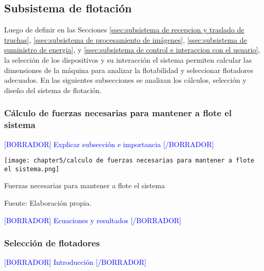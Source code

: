 \subsection{Subsistema de flotación}
\label{ssec:subsistema de flotacion}

Luego de definir en las Secciones \ref{ssec:subsistema de recepcion y traslado de truchas}, \ref{ssec:subsistema de procesamiento de imágenes}, \ref{ssec:subsistema de suministro de energia}, y \ref{ssec:subsistema de control e interaccion con el usuario}, la selección de los dispositivos y su interacción el sistema permiten calcular las dimensiones de la máquina para analizar la flotabilidad y seleccionar flotadores adecuados. En las siguientes subsecciones se analizan los cálculos, selección y diseño del sistema de flotación.

\subsubsection{Cálculo de fuerzas necesarias para mantener a flote el sistema}

\textcolor{blue}{[BORRADOR] Explicar subsección e importancia [/BORRADOR]} 

\begin{myfigure}[H]
	\centering
	\texttt{[image: chapter5/calculo de fuerzas necesarias para mantener a flote el sistema.png]}
	\caption{Fuerzas necesarias para mantener a flote el sistema}
	\begin{myflushleftportland}
		Fuente: Elaboración propia.
	\end{myflushleftportland}
	\label{fig:calculo de fuerzas necesarias para mantener a flote el sistema}
\end{myfigure}

\textcolor{blue}{[BORRADOR] Ecuaciones y resultados [/BORRADOR]} 

\subsubsection{Selección de flotadores}

\textcolor{blue}{[BORRADOR] Introducción [/BORRADOR]} 


